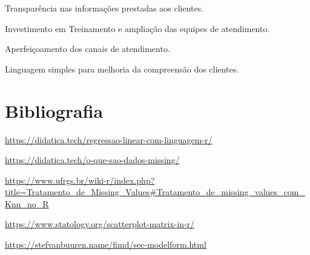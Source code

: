 \documentclass[
]{article}
\begin{document}
Transparência nas informações prestadas aos clientes.

Investimento em Treinamento e ampliação das equipes de atendimento.

Aperfeiçoamento dos canais de atendimento.

Linguagem simples para melhoria da compreensão dos clientes.

\hypertarget{bibliografia}{%
\section{Bibliografia}\label{bibliografia}}

\url{https://didatica.tech/regressao-linear-com-linguagem-r/}

\url{https://didatica.tech/o-que-sao-dados-missing/}

\url{https://www.ufrgs.br/wiki-r/index.php?title=Tratamento_de_Missing_Values\#Tratamento_de_missing_values_com_Knn_no_R}

\url{https://www.statology.org/scatterplot-matrix-in-r/}

\url{https://stefvanbuuren.name/fimd/sec-modelform.html}
\end{document}
